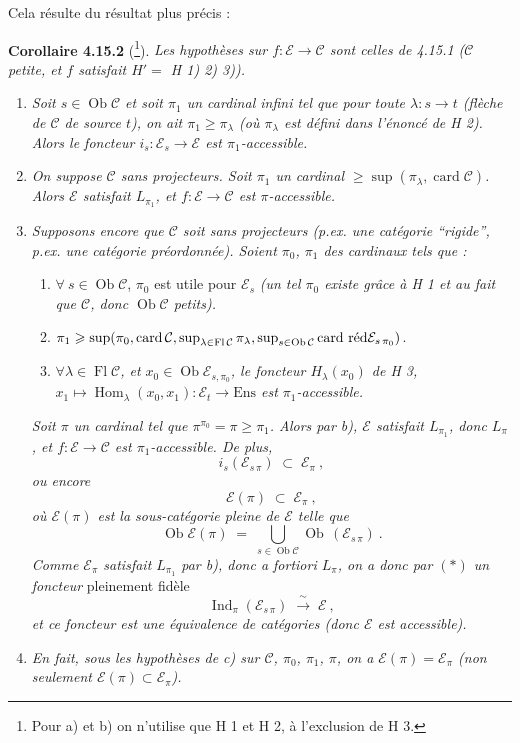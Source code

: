 \documentclass[11pt]{article}
\newcommand{\printedpage}[1]{\marginpar{\footnotesize p.~#1}}
\newcommand{\msp}[1]{\marginpar{\footnotesize [#1]}}
\newcommand{\cE}{\mathcal{E}}
\newcommand{\cC}{\mathcal{C}}
\newcommand{\Ob}{\operatorname{Ob}}
\newcommand{\Fl}{\operatorname{Fl}}
\newcommand{\Hom}{\operatorname{Hom}}
\newcommand{\Ind}{\operatorname{Ind}}
\newcommand{\Ens}{\mathrm{Ens}}
\newcommand{\card}{\operatorname{card}}
\newcommand{\cardred}{\operatorname{card}\,\text{\upshape réd}}
\begin{document}
Cela résulte du résultat plus précis :

\printedpage{162}

\msp{page 426}
\textbf{Corollaire 4.15.2} (\footnote{Pour a) et b) on n'utilise que H 1 et H 2, à l'exclusion de H 3.}). \textit{Les hypothèses sur $f : \cE \longrightarrow \cC$ sont celles de 4.15.1 ($\cC$ petite, et $f$ satisfait $H' =$ H 1) 2) 3)).}
\begin{enumerate}
\item[\textit{a)}] \textit{Soit $s \in \Ob\cC$ et soit $\pi_1$ un cardinal infini tel que pour toute $\lambda : s \longrightarrow t$ (flèche de $\cC$ de source $t$), on ait $\pi_1 \geqslant \pi_\lambda$ (où $\pi_\lambda$ est défini dans l'énoncé de H 2). Alors le foncteur $i_s : \cE_s \longrightarrow \cE$ est $\pi_1$-accessible.} %
\item[\textit{b)}] \textit{On suppose $\cC$ sans projecteurs. Soit $\pi_1$ un cardinal $\geqslant \sup(\pi_\lambda, \card\cC)$. Alors $\cE$ satisfait $L_{\pi_1}$, et $f : \cE \longrightarrow \cC$ est $\pi$-accessible.}
\item[\textit{c)}] \textit{Supposons encore que $\cC$ soit sans projecteurs (p.ex. une catégorie ``rigide'', p.ex. une catégorie préordonnée). Soient $\pi_0$, $\pi_1$ des cardinaux tels que :}
\begin{enumerate}
\item[\textcircled{\footnotesize $1^o$}] $\forall\ s \in \Ob\cC$, $\pi_0$ est utile pour $\cE_s$ \textit{(un tel $\pi_0$ existe grâce à H 1 et au fait que $\cC$, donc $\Ob\cC$ petits).}
\item[\textcircled{\footnotesize $2^o$}] $\pi_1 \geqslant \sup(\pi_0, \card\cC, \sup_{\lambda\in\Fl\cC}\pi_\lambda, \sup_{s\in\Ob\cC} \cardred \cE_{s\,\pi_0})$.
\item[\textcircled{\footnotesize $3^o$}] \textit{$\forall\lambda \in \Fl\cC$, et $x_0 \in \Ob\cE_{s,\pi_0}$, le foncteur $H_\lambda(x_0)$ de H 3, $x_1 \longmapsto \Hom_\lambda(x_0,x_1) : \cE_t \longrightarrow \Ens$ est $\pi_1$-accessible.}
\end{enumerate}
\textit{Soit $\pi$ un cardinal tel que $\pi^{\pi_0} = \pi \geqslant \pi_1$. Alors par b), $\cE$ satisfait $L_{\pi_1}$, donc $L_\pi$, et $f : \cE \longrightarrow \cC$ est $\pi_1$-accessible. De plus,}
\[
i_s(\cE_{s\,\pi}) \;\subset\; \cE_\pi\ ,
\]
\textit{ou encore}
\[
\cE(\pi) \;\subset\; \cE_\pi\ , \tag*{$(*)$}
\]
\textit{où $\cE(\pi)$ est la sous-catégorie pleine de $\cE$ telle que}
\[
\Ob\cE(\pi) \;=\; \bigcup_{s\in\Ob\cC} \Ob\,(\cE_{s\,\pi})\ .
\]
\textit{Comme $\cE_\pi$ satisfait $L_{\pi_1}$ par b), donc a fortiori $L_\pi$, on a donc par $(*)$ un foncteur} pleinement fidèle
\[
\Ind_\pi(\cE_{s\,\pi}) \;\xrightarrow{\ \sim\ }\; \cE\ ,
\]
\textit{et ce foncteur est une équivalence de catégories (donc $\cE$ est accessible).}
\item[\textit{d)}] \textit{En fait, sous les hypothèses de c) sur $\cC$, $\pi_0$, $\pi_1$, $\pi$, on a $\cE(\pi) = \cE_\pi$ (non seulement $\cE(\pi) \subset \cE_\pi$).}
\end{enumerate}
\end{document}
